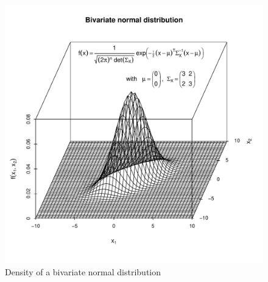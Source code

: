 \clearpage
\begin{figure}[htb!]
\begin{center}
\includegraphics[width=13cm]{binorm}
\end{center}
\vspace*{-12mm}\caption{Density of a bivariate normal distribution\label{binorm}}
\end{figure}

